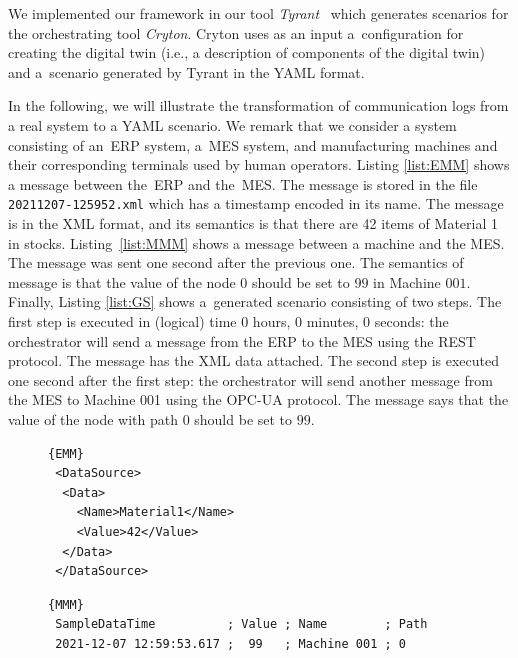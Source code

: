 {We implemented our framework in our tool \emph{Tyrant}~\cite{ref_tyrant} which
generates scenarios for the orchestrating tool \emph{Cryton}.
%
Cryton uses as an input a~configuration for creating the digital twin (i.e., a
description of components of the digital twin) and a~scenario generated by Tyrant in
the YAML format.
%

In the following, we will illustrate the transformation of communication logs
from a real system to a YAML scenario. We remark that we consider a system consisting
of an~ERP system, a~MES system, and manufacturing machines and their corresponding
terminals used by human operators.
%
Listing \ref{list:EMM} shows a message between the~ERP and the~MES. The message is
stored in the file \texttt{20211207-125952.xml} which has a timestamp encoded
in its name. The message is in the XML format, and its semantics is that there are 42
items of Material 1 in stocks. 
%
%
Listing~\ref{list:MMM} shows a message between a machine and the MES.  The message
was sent one second after the previous one. The semantics of message is that
the value of the node $0$ should be set to $99$ in Machine $001$.
%
%
Finally, Listing \ref{list:GS} shows a~generated scenario consisting of two
steps.  The first step is executed in (logical) time 0 hours, 0 minutes, 0
seconds: the orchestrator will send a message from the ERP to the MES using the REST
protocol. The message has the XML data attached.  The second step is executed
one second after the first step: the orchestrator will send another message
from the MES to Machine 001 using the OPC-UA protocol. The message says that the value
of the node with path $0$ should be set to $99$.
%

\begin{figure}
\begin{lstlisting}[caption=The file named 20211207-125952.xml containing XML message between ERP and MES.,frame=tlrb,label={list:EMM}]{EMM}
 <DataSource>
  <Data>
    <Name>Material1</Name>
    <Value>42</Value>
  </Data>
 </DataSource> 
\end{lstlisting}
\begin{lstlisting}[caption=A message between the MES and a machine,label={list:MMM},frame=tlrb]{MMM}
 SampleDataTime          ; Value ; Name        ; Path
 2021-12-07 12:59:53.617 ;  99   ; Machine 001 ; 0
\end{lstlisting}


\end{figure}}
